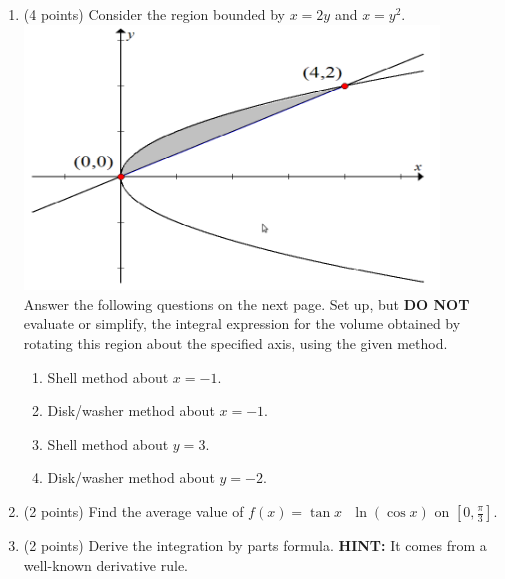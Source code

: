 \documentclass[paper=a4, fontsize=11pt]{scrartcl} %
\numberwithin{equation}{section} %
\numberwithin{figure}{section} %
\numberwithin{table}{section} %
\begin{document}
\begin{enumerate}
\item (4 points) Consider the region bounded by $x=2y$ and $x=y^2$.\\
\includegraphics[width=11cm]{IC2_4}\\
Answer the following questions on the next page. 
\newpage
Set up, but \textbf{DO NOT} evaluate or simplify, the integral expression for the volume obtained by rotating this region about the specified axis, using the given method.\\
\begin{enumerate}
\item Shell method about $x=-1$.
\vspace{1.5in}
\item Disk/washer method about $x=-1$.
\vspace{1.5in}
\item Shell method about $y=3$.
\vspace{1.5in}
\item Disk/washer method about $y=-2$.
\end{enumerate}

\newpage

\item (2 points) Find the average value of $f(x) = \tan x \text { }  \ln (\cos x)$ on $[0,\frac{\pi}{3}]$. 

\vspace{3in}

\item (2 points) Derive the integration by parts formula. \textbf{HINT:} It comes from a well-known derivative rule.

\end{enumerate}

\end{document}
